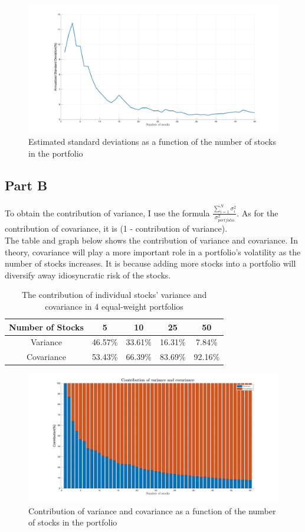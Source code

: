 \documentclass{report}
\begin{document}
\begin{figure}[H]
	\centering
	\includegraphics[width=1.0\textwidth]{figures/1A}
	\caption{Estimated standard deviations as a function of the number of stocks in the portfolio}
\end{figure}

\subsection{Part B}
To obtain the contribution of variance, I use the formula $\frac{\sum^{N}_{i=1}\sigma^2_{i}}{\sigma_{portfolio}^2}$. As for the contribution of covariance, it is (1 - contribution of variance).
\\The table and graph below shows the contribution of variance and covariance. In theory, covariance will play a more important role in a portfolio's volatility as the number of stocks increases. It is because adding more stocks into a portfolio will diversify away idiosyncratic risk of the stocks. 
\begin{table}[H]
	\centering
	\caption{The contribution of individual stocks' variance and covariance in 4 equal-weight portfolios}
	\begin{tabular}{ccccc}\hline\hline
	Number of Stocks & 5 & 10 & 25 & 50 \\\hline
	Variance & 46.57\% & 33.61\% & 16.31\% & 7.84\% \\
	Covariance & 53.43\% & 66.39\% & 83.69\% & 92.16\% \\ \hline
	\end{tabular}
\end{table}

\begin{figure}[H]
	\centering
	\includegraphics[width= 1.0\textwidth]{figures/1B}
	\caption{Contribution of variance and covariance as a function of the number of stocks in the portfolio}
\end{figure}
\end{document}
